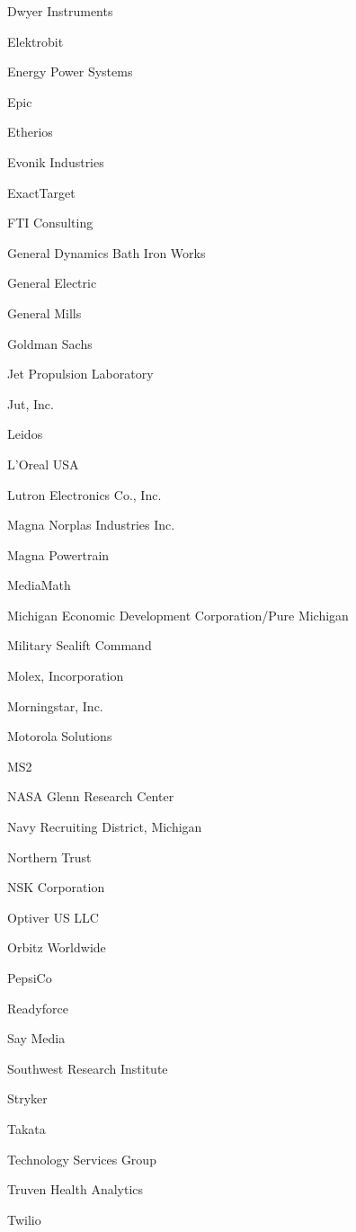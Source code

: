 \documentclass[twoside]{article}
\begin{document}
\begin{center}
\begin{multicols}{5}
\begin{FlushLeft}
\begin{compactitem}
\item Dwyer Instruments
\item Elektrobit
\item Energy Power Systems
\item Epic
\item Etherios
\item Evonik Industries
\item ExactTarget
\item FTI Consulting
\item General Dynamics Bath Iron Works
\item General Electric
\item General Mills
\item Goldman Sachs
\item Jet Propulsion Laboratory
\item Jut, Inc.
\item Leidos
\item L'Oreal USA
\item Lutron Electronics Co., Inc.
\item Magna Norplas Industries Inc.
\item Magna Powertrain
\item MediaMath
\item Michigan Economic Development Corporation/Pure Michigan
\item Military Sealift Command
\item Molex, Incorporation
\item Morningstar, Inc.
\item Motorola Solutions
\item MS2
\item NASA Glenn Research Center
\item Navy Recruiting District, Michigan
\item Northern Trust
\item NSK Corporation
\item Optiver US LLC
\item Orbitz Worldwide
\item PepsiCo
\item Readyforce
\item Say Media
\item Southwest Research Institute
\item Stryker
\item Takata
\item Technology Services Group
\item Truven Health Analytics
\item Twilio

\end{compactitem}
\end{FlushLeft}
\end{multicols}
\end{center}
\end{document}
